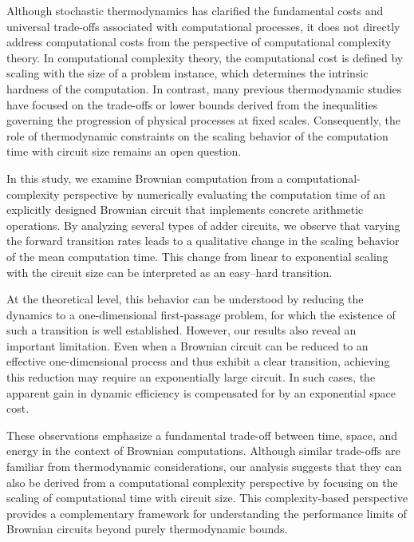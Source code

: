 \documentclass[%
 reprint,
superscriptaddress,
 amsmath,amssymb,
 aps,
 prx,
]{revtex4-2}
\begin{document}
Although stochastic thermodynamics has clarified the fundamental costs and universal trade-offs associated with computational processes, it does not directly address computational costs from the perspective of computational complexity theory. In computational complexity theory, the computational cost is defined by scaling with the size of a problem instance, which determines the intrinsic hardness of the computation. In contrast, many previous thermodynamic studies have focused on the trade-offs or lower bounds derived from the inequalities governing the progression of physical processes at fixed scales. Consequently, the role of thermodynamic constraints on the scaling behavior of the computation time with circuit size remains an open question.  

In this study, we examine Brownian computation from a computational-complexity perspective by numerically evaluating the computation time of an explicitly designed Brownian circuit that implements concrete arithmetic operations. By analyzing several types of adder circuits, we observe that varying the forward transition rates leads to a qualitative change in the scaling behavior of the mean computation time. This change from linear to exponential scaling with the circuit size can be interpreted as an easy--hard transition. 

At the theoretical level, this behavior can be understood by reducing the dynamics to a one-dimensional first-passage problem, for which the existence of such a transition is well established. However, our results also reveal an important limitation. Even when a Brownian circuit can be reduced to an effective one-dimensional process and thus exhibit a clear transition, achieving this reduction may require an exponentially large circuit. In such cases, the apparent gain in dynamic efficiency is compensated for by an exponential space cost. 

These observations emphasize a fundamental trade-off between time, space, and energy in the context of Brownian computations. Although similar trade-offs are familiar from thermodynamic considerations, our analysis suggests that they can also be derived from a computational complexity perspective by focusing on the scaling of computational time with circuit size. This complexity-based perspective provides a complementary framework for understanding the performance limits of Brownian circuits beyond purely thermodynamic bounds.
\end{document}

